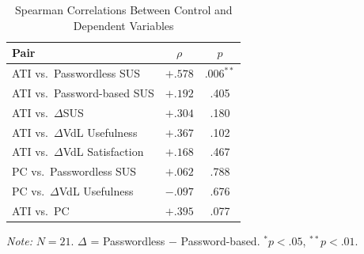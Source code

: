 ﻿%
\begin{table}[htbp]
    \centering
    \begin{threeparttable}
        \caption{Spearman Correlations Between Control and Dependent Variables}
        \label{tab:correlations}
        \begin{tabular}{lcc}
            \toprule
            \textbf{Pair} & \textbf{$\rho$} & \textbf{$p$} \\
            \midrule
            ATI vs.\ Passwordless SUS        & $+.578$ & $.006^{**}$  \\
            ATI vs.\ Password-based SUS      & $+.192$ & .405    \\
            ATI vs.\ $\Delta$SUS             & $+.304$ & .180    \\
            ATI vs.\ $\Delta$VdL Usefulness  & $+.367$ & .102    \\
            ATI vs.\ $\Delta$VdL Satisfaction & $+.168$ & .467   \\
            PC vs.\ Passwordless SUS         & $+.062$ & .788    \\
            PC vs.\ $\Delta$VdL Usefulness   & $-.097$ & .676    \\
            ATI vs.\ PC                      & $+.395$ & .077    \\
            \bottomrule
        \end{tabular}
        \begin{tablenotes}
            \small
            \item \textit{Note:} $N = 21$. $\Delta$ = Passwordless $-$ Password-based. $^{*} p < .05$, $^{**} p < .01$.
        \end{tablenotes}
    \end{threeparttable}
\end{table}
